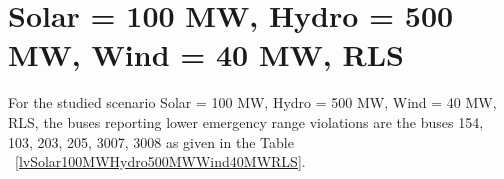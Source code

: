 \documentclass[10pt]{report}
\begin{document}
\section{Solar = 100 MW, Hydro = 500 MW, Wind = 40 MW, RLS}
For the studied scenario Solar = 100 MW, Hydro = 500 MW, Wind = 40 MW, RLS, the buses reporting lower emergency range violations are the buses 154, 103, 203, 205, 3007, 3008 as given in the Table ~\ref{lvSolar100MWHydro500MWWind40MWRLS}.
\begin{table}[H]
\caption{Contingencies reporting bus voltages lower than emergency voltage of 1.1 PU for scenario Solar = 100 MW, Hydro = 500 MW, Wind = 40 MW, RLS}
\label{lvSolar100MWHydro500MWWind40MWRLS}
\centering
{}
\end{table}
\end{document}
